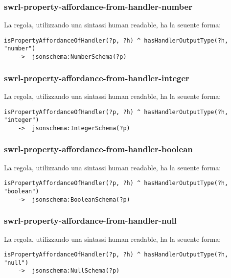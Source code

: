 \subsubsection{swrl-property-affordance-from-handler-number}
La regola, utilizzando una sintassi human readable, ha la seuente forma:
\begin{verbatim}
isPropertyAffordanceOfHandler(?p, ?h) ^ hasHandlerOutputType(?h, "number")
	->  jsonschema:NumberSchema(?p)
\end{verbatim}

\subsubsection{swrl-property-affordance-from-handler-integer}
La regola, utilizzando una sintassi human readable, ha la seuente forma:
\begin{verbatim}
isPropertyAffordanceOfHandler(?p, ?h) ^ hasHandlerOutputType(?h, "integer")
	->  jsonschema:IntegerSchema(?p)
\end{verbatim}

\subsubsection{swrl-property-affordance-from-handler-boolean}
La regola, utilizzando una sintassi human readable, ha la seuente forma:
\begin{verbatim}
isPropertyAffordanceOfHandler(?p, ?h) ^ hasHandlerOutputType(?h, "boolean")
	->  jsonschema:BooleanSchema(?p)
\end{verbatim}

\subsubsection{swrl-property-affordance-from-handler-null}
La regola, utilizzando una sintassi human readable, ha la seuente forma:
\begin{verbatim}
isPropertyAffordanceOfHandler(?p, ?h) ^ hasHandlerOutputType(?h, "null")
	->  jsonschema:NullSchema(?p)
\end{verbatim}
